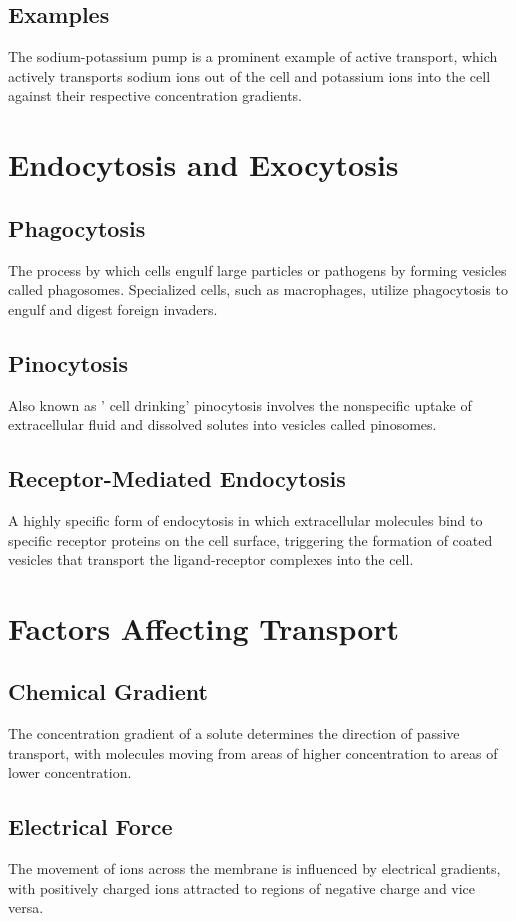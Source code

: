 \documentclass{article}
\begin{document}
\subsection{Examples}
The sodium-potassium pump is a prominent example of active transport, which actively transports sodium ions out of the cell and potassium ions into the cell against their respective concentration gradients.

\section*{Endocytosis and Exocytosis}

\subsection{Phagocytosis}
The process by which cells engulf large particles or pathogens by forming vesicles called phagosomes. Specialized cells, such as macrophages, utilize phagocytosis to engulf and digest foreign invaders.

\subsection{Pinocytosis}
Also known as ' cell drinking' pinocytosis involves the nonspecific uptake of extracellular fluid and dissolved solutes into vesicles called pinosomes.

\subsection{Receptor-Mediated Endocytosis}
A highly specific form of endocytosis in which extracellular molecules bind to specific receptor proteins on the cell surface, triggering the formation of coated vesicles that transport the ligand-receptor complexes into the cell.

\section*{Factors Affecting Transport}

\subsection{Chemical Gradient}
The concentration gradient of a solute determines the direction of passive transport, with molecules moving from areas of higher concentration to areas of lower concentration.

\subsection{Electrical Force}
The movement of ions across the membrane is influenced by electrical gradients, with positively charged ions attracted to regions of negative charge and vice versa.
\end{document}
